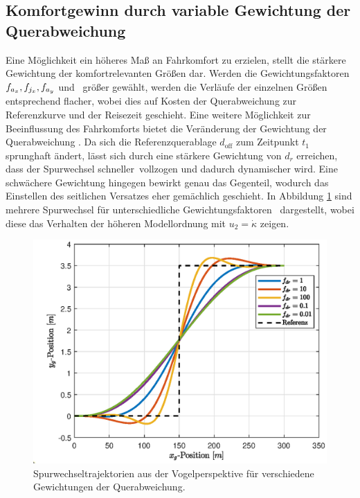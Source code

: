 \subsection{Komfortgewinn durch variable Gewichtung der Querabweichung}
Eine Möglichkeit ein höheres Maß an Fahrkomfort zu erzielen, stellt die stärkere Gewichtung der komfortrelevanten Größen dar. Werden die Gewichtungsfaktoren $f_{a_x}, f_{j_x}, f_{a_y}$ und \fjy~größer gewählt, werden die Verläufe der einzelnen Größen entsprechend flacher, wobei dies auf Kosten der Querabweichung zur Referenzkurve und der Reisezeit geschieht. Eine weitere Möglichkeit zur Beeinflussung des Fahrkomforts bietet die Veränderung der Gewichtung der Querabweichung \fdr. Da sich die Referenzquerablage $d_{\textrm{off}}$ zum Zeitpunkt $t_1$ sprunghaft ändert, lässt sich durch eine stärkere Gewichtung von $d_r$ erreichen, dass der Spurwechsel \glqq schneller\grqq~vollzogen und dadurch dynamischer wird. Eine schwächere Gewichtung hingegen bewirkt genau das Gegenteil, wodurch das Einstellen des seitlichen Versatzes eher gemächlich geschieht. In Abbildung \ref{fig:xy_pos_fdr_var} sind mehrere Spurwechsel für unterschiedliche Gewichtungsfaktoren \fdr~dargestellt, wobei diese das Verhalten der höheren Modellordnung mit $u_2 = \dot{\kappa}$ zeigen. 
\begin{figure}[h] 
	\centering
	\includegraphics[width=0.7\linewidth]{./Bilder/Ergebnisse/Geradeausfahrt/Spurwechsel/fdr_var/xy_pos.eps}
	\caption{Spurwechseltrajektorien aus der Vogelperspektive für verschiedene Gewichtungen der Querabweichung.}
	\label{fig:xy_pos_fdr_var}
\end{figure} 
